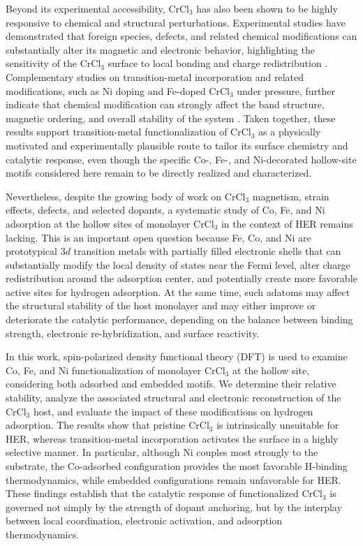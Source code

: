 \documentclass[journal=jacsat,manuscript=article]{achemso}
\begin{document}
Beyond its experimental accessibility, CrCl$_3$ has also been shown to be highly responsive to chemical and structural perturbations. Experimental studies have demonstrated that foreign species, defects, and related chemical modifications can substantially alter its magnetic and electronic behavior, highlighting the sensitivity of the CrCl$_3$ surface to local bonding and charge redistribution \cite{Luo2020,Gao2018,Mastrippolito2021,Mastrippolito2022}. Complementary studies on transition-metal incorporation and related modifications, such as Ni doping and Fe-doped CrCl$_3$ under pressure, further indicate that chemical modification can strongly affect the band structure, magnetic ordering, and overall stability of the system \cite{Wang2019,Abdel-Hafiez2025,Safi2023}. Taken together, these results support transition-metal functionalization of CrCl$_3$ as a physically motivated and experimentally plausible route to tailor its surface chemistry and catalytic response, even though the specific Co-, Fe-, and Ni-decorated hollow-site motifs considered here remain to be directly realized and characterized.

Nevertheless, despite the growing body of work on CrCl$_3$ magnetism, strain effects, defects, and selected dopants, a systematic study of Co, Fe, and Ni adsorption at the hollow sites of monolayer CrCl$_3$ in the context of HER remains lacking. This is an important open question because Fe, Co, and Ni are prototypical $3d$ transition metals with partially filled electronic shells that can substantially modify the local density of states near the Fermi level, alter charge redistribution around the adsorption center, and potentially create more favorable active sites for hydrogen adsorption. At the same time, such adatoms may affect the structural stability of the host monolayer and may either improve or deteriorate the catalytic performance, depending on the balance between binding strength, electronic re-hybridization, and surface reactivity.

In this work, spin-polarized density functional theory (DFT) is used to examine Co, Fe, and Ni functionalization of monolayer CrCl$_3$ at the hollow site, considering both adsorbed and embedded motifs. We determine their relative stability, analyze the associated structural and electronic reconstruction of the CrCl$_3$ host, and evaluate the impact of these modifications on hydrogen adsorption. The results show that pristine CrCl$_3$ is intrinsically unsuitable for HER, whereas transition-metal incorporation activates the surface in a highly selective manner. In particular, although Ni couples most strongly to the substrate, the Co-adsorbed configuration provides the most favorable H-binding thermodynamics, while embedded configurations remain unfavorable for HER. These findings establish that the catalytic response of functionalized CrCl$_3$ is governed not simply by the strength of dopant anchoring, but by the interplay between local coordination, electronic activation, and adsorption thermodynamics.
\end{document}
